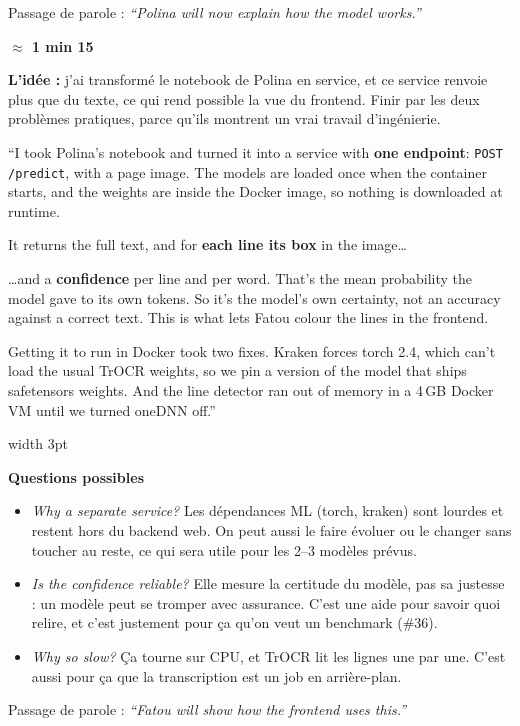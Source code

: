 \documentclass[11pt,a4paper]{article}
\newenvironment{say}
  {\par\smallskip\noindent\begin{lrbox}{\boxcontent}\begin{minipage}{\dimexpr\linewidth-19pt}\vspace{6pt}\selectlanguage{english}\setlength{\parskip}{5pt}}
  {\vspace{6pt}\end{minipage}\end{lrbox}{\setlength{\fboxsep}{0pt}\colorbox{accent!6}{\textcolor{accent}{\vrule width 3pt}\hspace{8pt}\usebox{\boxcontent}\hspace{8pt}}}\par\smallskip}
\newcommand{\slide}[3]{\vspace{10pt}{\color{ink}\large\bfseries Diapo #1 -- #2}\hfill{\color{accent}\bfseries #3}\par\vspace{-2pt}{\color{ink}\rule{\linewidth}{0.4pt}}\par}
\newcommand{\idee}[1]{\textbf{L'idée :} #1\par}
\begin{document}
Passage de parole : \textit{\foreignlanguage{english}{``Polina will now explain how the model works.''}}

\slide{7}{ML backend}{$\approx$ 1 min 15}
\idee{j'ai transformé le notebook de Polina en service, et ce service renvoie plus que du texte, ce qui rend possible la vue du frontend. Finir par les deux problèmes pratiques, parce qu'ils montrent un vrai travail d'ingénierie.}
\begin{say}
``I took Polina's notebook and turned it into a service with \textbf{one endpoint}: \texttt{POST /predict}, with a page image. The models are loaded once when the container starts, and the weights are inside the Docker image, so nothing is downloaded at runtime.

It returns the full text, and for \textbf{each line its box} in the image\dots

\dots and a \textbf{confidence} per line and per word. That's the mean probability the model gave to its own tokens. So it's the model's own certainty, not an accuracy against a correct text. This is what lets Fatou colour the lines in the frontend.

Getting it to run in Docker took two fixes. Kraken forces torch 2.4, which can't load the usual TrOCR weights, so we pin a version of the model that ships safetensors weights. And the line detector ran out of memory in a 4\,GB Docker VM until we turned oneDNN off.''
\end{say}

\textbf{Questions possibles}
\begin{itemize}[leftmargin=*]
  \item \textit{Why a separate service?} Les dépendances ML (torch, kraken) sont lourdes et restent hors du backend web. On peut aussi le faire évoluer ou le changer sans toucher au reste, ce qui sera utile pour les 2--3 modèles prévus.
  \item \textit{Is the confidence reliable?} Elle mesure la certitude du modèle, pas sa justesse : un modèle peut se tromper avec assurance. C'est une aide pour savoir quoi relire, et c'est justement pour ça qu'on veut un benchmark (\#36).
  \item \textit{Why so slow?} Ça tourne sur CPU, et TrOCR lit les lignes une par une. C'est aussi pour ça que la transcription est un job en arrière-plan.
\end{itemize}

Passage de parole : \textit{\foreignlanguage{english}{``Fatou will show how the frontend uses this.''}}
\end{document}
